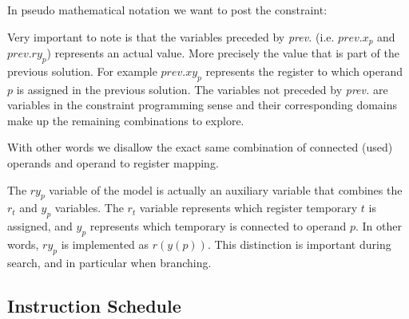 \vspace{0.2cm}

\noindent{}

\vspace{0.2cm}

In pseudo mathematical notation we want to post the constraint:

\vspace{0.2cm}
\noindent{}
\vspace{0.2cm}

Very important to note is that the variables preceded by \textit{prev.} (i.e. $prev.x_p$ and
$prev.ry_p$) represents an actual value. More precisely the value that is part of the previous
solution. For example $prev.xy_p$ represents the register to which operand $p$ is assigned
in the previous solution. The variables not preceded by \textit{prev.} are variables in
the constraint programming sense and their corresponding domains make up the remaining
combinations to explore.

With other words we disallow the exact same combination of connected (used) operands and
operand to register mapping.

The $ry_p$ variable of the model is actually an auxiliary variable that combines the
$r_t$ and $y_p$ variables. The $r_t$ variable represents which register temporary $t$ is
assigned, and $y_p$ represents which temporary is connected to operand $p$. In other words,
$ry_p$ is implemented as $r(y(p))$. This distinction is important during search, and in
particular when branching.

\subsection{Instruction Schedule}
\label{sec:schedule}

